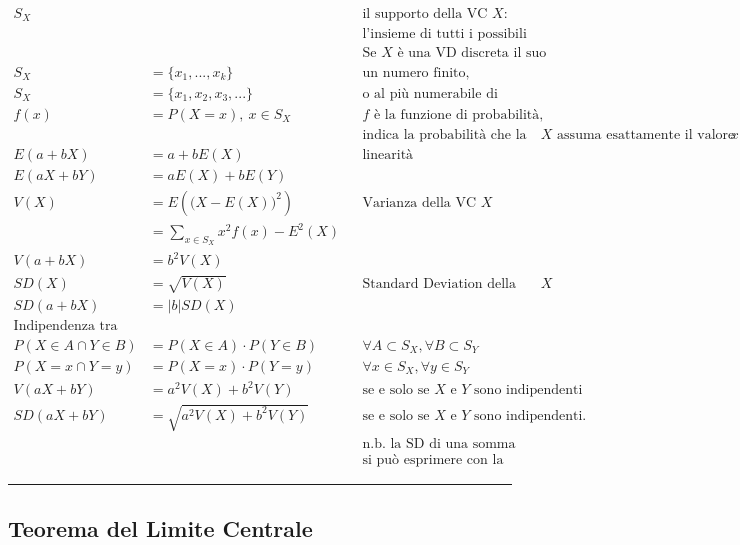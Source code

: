 \documentclass[
  11pt,
]{book}
\theoremstyle{mytheoremstyle}
\theoremstyle{mydefstyle}
\begin{document}
\begin{align*}
 S_X& & & \text{il supporto della VC $X$:} \\ 
 & & & \text{l'insieme di tutti i possibili valori che la VC può assumere. } \\ 
  &      & & \text{Se $X$ è una VD discreta il suo supporto ha:} \\ 
S_X&=\{x_1,...,x_k\} & & \text{un numero finito, } \\ 
S_X&=\{x_1,x_2,x_3,...\} & &  \text{o al più numerabile di elementi.} \\ 
 f(x)&=P(X=x),~x\in S_X & & \text{$f$ è la funzione di probabilità,} \\ 
 & & & \text{indica la probabilità che la VC $X$ assuma esattamente il valore $x$.} \\ 
E(a+bX)&=a+bE(X) & & \text{linearità} \\ 
 E(aX+bY)&=aE(X)+bE(Y) & &  \\ 
 V(X)&=E\left(\big(X-E(X)\big)^2\right) & & \text{Varianza della VC $X$} \\ 
&=\sum_{x\in S_X}x^2f(x)-E^2(X)  & &  \\ 
V(a+bX)&=b^2V(X) & &  \\ 
SD(X)&=\sqrt{V(X)} & & \text{Standard Deviation della VC $X$} \\ 
SD(a+bX)&=|b| SD(X) & &  \\ 
\text{Indipendenza tra VC}& & &  \\ 
P(X\in A\cap Y\in B)&=P(X\in A)\cdot P(Y\in B) & & \forall A \subset S_X,\forall B \subset S_Y \\ 
P(X=x\cap Y=y)&=P(X=x)\cdot P(Y=y) & & \forall x \in S_X,\forall y \in S_Y \\ 
V(aX+bY)&=a^2V(X)+b^2V(Y) & & \text{se e solo se $X$ e $Y$ sono indipendenti} \\ 
SD(aX+bY)&=\sqrt{a^2V(X)+b^2V(Y)} & & \text{se e solo se $X$ e $Y$ sono indipendenti. } \\ 
& & & \text{n.b. la SD di una somma non  } \\ 
& & & \text{si può esprimere con la somma delle SD.}  
\end{align*}

\begin{center}\rule{0.5\linewidth}{0.5pt}\end{center}

\subsection{Teorema del Limite Centrale}\label{teorema-del-limite-centrale}
\end{document}
